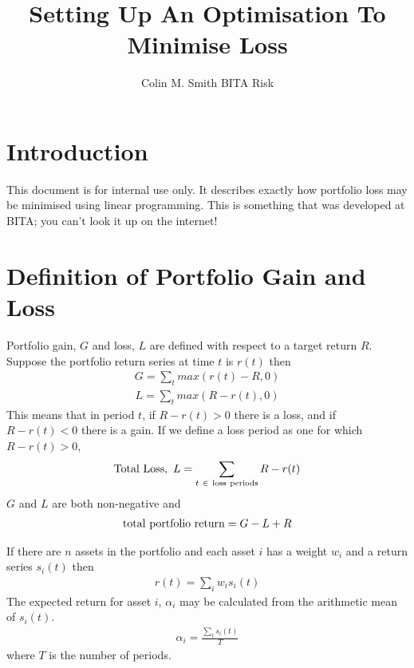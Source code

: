 \documentclass{article}
\title{Setting Up An Optimisation To Minimise Loss}
\author{Colin M. Smith BITA Risk}
\begin{document}
\maketitle
\tableofcontents
\pagebreak
\section{Introduction}
This document is for internal use only. It describes exactly how portfolio loss may be minimised
using linear programming. This is something that was developed at BITA; you can't look it up on the internet!
\section{Definition of Portfolio Gain and Loss}
Portfolio gain, $G$ and loss, $L$ are defined with respect to a target return $R$. Suppose the portfolio return
series at time $t$ is $r(t)$ then
\begin{eqnarray}
    G = \sum_t max(r(t) - R,0)
\end{eqnarray}
\begin{eqnarray}
    L = \sum_t max(R-r(t),0)
\end{eqnarray}
This means that in period $t$, if $R-r(t) > 0$ there is a loss, and if $R-r(t) < 0$ there is a gain.
If we define a loss period as one for which $R-r(t) > 0$,
\begin{eqnarray}
  {\rm Total\ Loss},\ L= \sum_{t\ \in\ \rm loss\ periods} R-r(t)
\end{eqnarray}
$G$ and $L$ are both non-negative and
\begin{eqnarray}
 {\rm   total\ portfolio\ return}= G - L + R
\end{eqnarray}

If there are $n$ assets in the portfolio and each asset $i$
has a weight $w_i$ and a return series $s_i (t)$ then
\begin{eqnarray}
    r(t) = \sum_i w_i s_i(t)
\end{eqnarray}
The expected return for asset $i$, $\alpha_i$ may be calculated from the arithmetic
mean of $s_i(t)$.
\begin{eqnarray}
    \alpha_i = \frac{\sum_t s_i(t)} {T} 
\end{eqnarray}
where $T$ is the number of periods.
\end{document}
